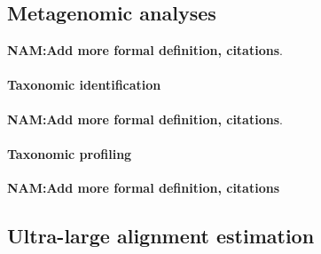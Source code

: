 \subsection{Metagenomic analyses}\label{back:metagenomic}
\textbf{NAM:Add more formal definition, citations}.
\paragraph{Taxonomic identification}\label{back:taxonomic_id}

\textbf{NAM:Add more formal definition, citations}.
\paragraph{Taxonomic profiling}\label{back:taxonomic_profiling}
\textbf{NAM:Add more formal definition, citations}
\subsection{Ultra-large alignment estimation}\label{back:ultra_large}
